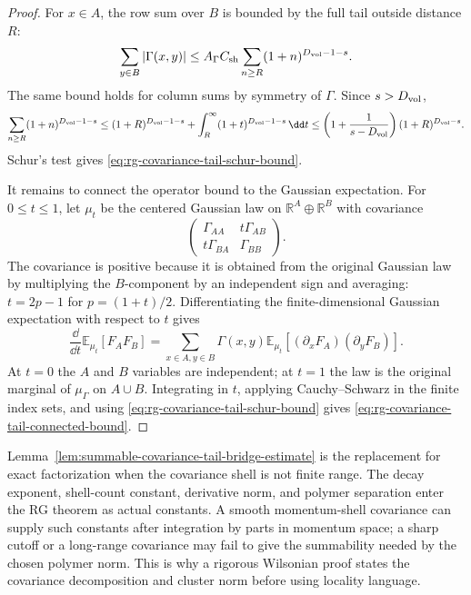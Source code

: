 \begin{proof}
For \(x\in A\), the row sum over \(B\) is bounded by the full tail outside
distance \(R\):
\[
  \sum_{y\in B}|\Gamma(x,y)|
  \leq
  A_\Gamma C_{\rm sh}
  \sum_{n\geq R}(1+n)^{D_{\rm vol}-1-s}.
\]
The same bound holds for column sums by symmetry of \(\Gamma\).  Since
\(s>D_{\rm vol}\),
\[
  \sum_{n\geq R}(1+n)^{D_{\rm vol}-1-s}
  \leq
  (1+R)^{D_{\rm vol}-1-s}
  +
  \int_R^\infty (1+t)^{D_{\rm vol}-1-s}\,\dd t
  \leq
  \left(1+\frac1{s-D_{\rm vol}}\right)
  (1+R)^{D_{\rm vol}-s}.
\]
Schur's test gives
\eqref{eq:rg-covariance-tail-schur-bound}.

It remains to connect the operator bound to the Gaussian expectation.  For
\(0\leq t\leq1\), let \(\mu_t\) be the centered Gaussian law on
\(\mathbb R^A\oplus\mathbb R^B\) with covariance
\[
  \begin{pmatrix}
    \Gamma_{AA} & t\Gamma_{AB}\\
    t\Gamma_{BA} & \Gamma_{BB}
  \end{pmatrix}.
\]
The covariance is positive because it is obtained from the original Gaussian
law by multiplying the \(B\)-component by an independent sign and averaging:
\(t=2p-1\) for \(p=(1+t)/2\).  Differentiating the finite-dimensional
Gaussian expectation with respect to \(t\) gives
\[
  \frac{\dd}{\dd t}\mathbb E_{\mu_t}[F_A F_B]
  =
  \sum_{x\in A,y\in B}\Gamma(x,y)
  \mathbb E_{\mu_t}[(\partial_xF_A)(\partial_yF_B)] .
\]
At \(t=0\) the \(A\) and \(B\) variables are independent; at \(t=1\) the law
is the original marginal of \(\mu_\Gamma\) on \(A\cup B\).  Integrating in
\(t\), applying Cauchy--Schwarz in the finite index sets, and using
\eqref{eq:rg-covariance-tail-schur-bound} gives
\eqref{eq:rg-covariance-tail-connected-bound}.
\end{proof}

Lemma~\ref{lem:summable-covariance-tail-bridge-estimate} is the replacement
for exact factorization when the covariance shell is not finite range.  The
decay exponent, shell-count constant, derivative norm, and polymer separation
enter the RG theorem as actual constants.  A smooth momentum-shell covariance
can supply such constants after integration by parts in momentum space; a
sharp cutoff or a long-range covariance may fail to give the summability
needed by the chosen polymer norm.  This is why a rigorous Wilsonian proof
states the covariance decomposition and cluster norm before using locality
language.

